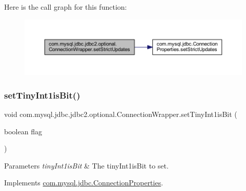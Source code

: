 Here is the call graph for this function\+:
\nopagebreak
\begin{figure}[H]
\begin{center}
\leavevmode
\includegraphics[width=350pt]{classcom_1_1mysql_1_1jdbc_1_1jdbc2_1_1optional_1_1_connection_wrapper_afcbd497f79720ae946cda438dad6ec65_cgraph}
\end{center}
\end{figure}
\mbox{\label{classcom_1_1mysql_1_1jdbc_1_1jdbc2_1_1optional_1_1_connection_wrapper_a6cad9c36cb924008caf164e37c618362}} 
\subsubsection{\texorpdfstring{set\+Tiny\+Int1is\+Bit()}{setTinyInt1isBit()}}
{\footnotesize\ttfamily void com.\+mysql.\+jdbc.\+jdbc2.\+optional.\+Connection\+Wrapper.\+set\+Tiny\+Int1is\+Bit (\begin{DoxyParamCaption}\item[{boolean}]{flag }\end{DoxyParamCaption})}


\begin{DoxyParams}{Parameters}
{\em tiny\+Int1is\+Bit} & The tiny\+Int1is\+Bit to set. \\
\hline
\end{DoxyParams}


Implements \mbox{\hyperlink{interfacecom_1_1mysql_1_1jdbc_1_1_connection_properties_ac1fb7af1cc73512dd8dac99bdc7a5602}{com.\+mysql.\+jdbc.\+Connection\+Properties}}.

